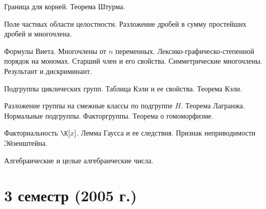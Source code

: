 \documentclass[a4paper]{article}
\begin{document}
\begin{nums}{0}
Граница для корней. Теорема Штурма.
\item Поле частных области целостности. Разложение дробей в сумму простейших дробей и многочлена.
\item Формулы Виета. Многочлены от $n$ переменных. Лексико-графическо-степенной порядок на мономах.
Старший член и его свойства. Симметрические многочлены. Результант и дискриминант.
\item Подгруппы циклических групп. Таблица Кэли и ее свойства. Теорема Кэли.
\item Разложение группы на смежные классы по подгруппе $H$. Теорема Лагранжа. Нормальные подгруппы.
Факторгруппы. Теорема о гомоморфизме.
\item Факториальность $\K[x]$. Лемма Гаусса и ее следствия. Признак неприводимости Эйзенштейна.
\item Алгебраические и целые алгебраические числа.
\end{nums}

\medskip\dmvntrail

\pagebreak

\section*{3 семестр (2005 г.)}
\end{document}
